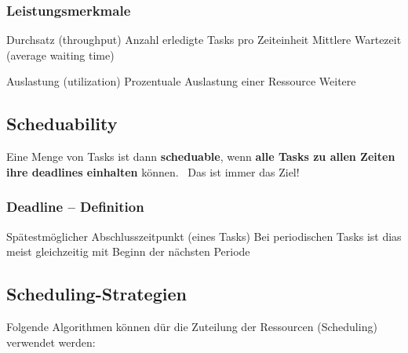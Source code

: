\subsubsection{Leistungsmerkmale}

\begin{minipage}[t]{0.52\columnwidth}
    \raggedright

    \begin{outline}
        \1 Durchsatz (throughput)
            \2 Anzahl erledigte Tasks pro Zeiteinheit
        \1 Mittlere Wartezeit (average waiting time)
    \end{outline}
\end{minipage}
\hfill
\begin{minipage}[t]{0.45\columnwidth}
    \raggedright

    \begin{outline}
        \1 Auslastung (utilization)
            \2 Prozentuale Auslastung einer Ressource
        \1 Weitere
    \end{outline}
\end{minipage}


\subsection{Scheduability}

Eine Menge von Tasks ist dann \textbf{scheduable}, wenn \textbf{alle Tasks zu allen Zeiten ihre deadlines einhalten} können. 
\textrightarrow\ Das ist immer das Ziel!

\subsubsection{Deadline -- Definition}

\begin{outline}
    \1 Spätestmöglicher Abschlusszeitpunkt (eines Tasks)
        \2 Bei periodischen Tasks ist dias meist gleichzeitig mit Beginn der nächsten Periode
\end{outline}


\subsection{Scheduling-Strategien}
\label{Scheduling-Strategien}

Folgende Algorithmen können dür die Zuteilung der Ressourcen (Scheduling) verwendet werden:

